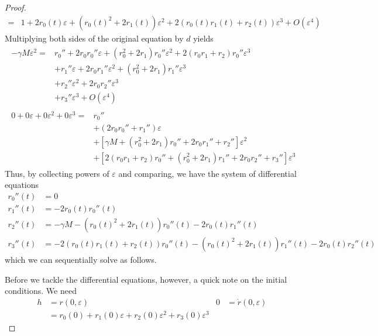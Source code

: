 \documentclass[../notes.tex]{subfiles}
\begin{document}
\begin{enumerate}[label={\textbf{1.\arabic*.}},ref={1.\arabic*},leftmargin=3.5em]
\begin{proof}
\begin{align*}
            ={}& 1+2r_0(t)\varepsilon+(r_0(t)^2+2r_1(t))\varepsilon^2+2(r_0(t)r_1(t)+r_2(t))\varepsilon^3+O(\varepsilon^4)
        \end{align*}
        Multiplying both sides of the original equation by $d$ yields
        \begin{align*}
            \begin{split}
                -\gamma M\varepsilon^2 ={}& r_0''+2r_0r_0''\varepsilon+(r_0^2+2r_1)r_0''\varepsilon^2+2(r_0r_1+r_2)r_0''\varepsilon^3\\
                &+r_1''\varepsilon+2r_0r_1''\varepsilon^2+(r_0^2+2r_1)r_1''\varepsilon^3\\
                &+r_2''\varepsilon^2+2r_0r_2''\varepsilon^3\\
                &+r_3''\varepsilon^3+O(\varepsilon^4)
            \end{split}\\
            \begin{split}
                0+0\varepsilon+0\varepsilon^2+0\varepsilon^3 ={}& r_0''\\
                &+(2r_0r_0''+r_1'')\varepsilon\\
                &+[\gamma M+(r_0^2+2r_1)r_0''+2r_0r_1''+r_2'']\varepsilon^2\\
                &+[2(r_0r_1+r_2)r_0''+(r_0^2+2r_1)r_1''+2r_0r_2''+r_3'']\varepsilon^3
            \end{split}
        \end{align*}
        Thus, by collecting powers of $\varepsilon$ and comparing, we have the system of differential equations
        \begin{align*}
            r_0''(t) &= 0\\
            r_1''(t) &= -2r_0(t)r_0''(t)\\
            r_2''(t) &= -\gamma M-(r_0(t)^2+2r_1(t))r_0''(t)-2r_0(t)r_1''(t)\\
            r_3''(t) &= -2(r_0(t)r_1(t)+r_2(t))r_0''(t)-(r_0(t)^2+2r_1(t))r_1''(t)-2r_0(t)r_2''(t)
        \end{align*}
        which we can sequentially solve as follows.\par
        Before we tackle the differential equations, however, a quick note on the initial conditions. We need
        \begin{align*}
            h &= r(0,\varepsilon)&
                0 &= \dot{r}(0,\varepsilon)\\
            &= r_0(0)+r_1(0)\varepsilon+r_2(0)\varepsilon^2+r_3(0)\varepsilon^3&

\end{align*}
\end{proof}
\end{enumerate}
\end{document}
